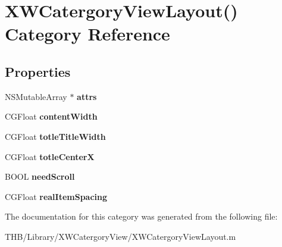 \hypertarget{category_x_w_catergory_view_layout_07_08}{}\section{X\+W\+Catergory\+View\+Layout() Category Reference}
\label{category_x_w_catergory_view_layout_07_08}
\subsection*{Properties}
\begin{DoxyCompactItemize}
\item 
\mbox{\label{category_x_w_catergory_view_layout_07_08_a1cc95694b6427f4bc37f47c714371f0c}} 
N\+S\+Mutable\+Array $\ast$ {\bfseries attrs}
\item 
\mbox{\label{category_x_w_catergory_view_layout_07_08_a2affd284ac99da67053cc58fa49ed355}} 
C\+G\+Float {\bfseries content\+Width}
\item 
\mbox{\label{category_x_w_catergory_view_layout_07_08_a4e95b7c48d33dc4331c8b7d1194efa25}} 
C\+G\+Float {\bfseries totle\+Title\+Width}
\item 
\mbox{\label{category_x_w_catergory_view_layout_07_08_a80ee7f25b333ff586dc97707c91a8648}} 
C\+G\+Float {\bfseries totle\+CenterX}
\item 
\mbox{\label{category_x_w_catergory_view_layout_07_08_a531dc40e66dc4558f2eaf7b4858455e8}} 
B\+O\+OL {\bfseries need\+Scroll}
\item 
\mbox{\label{category_x_w_catergory_view_layout_07_08_aa7b6e704aeb6b1f62d79d546c3b33139}} 
C\+G\+Float {\bfseries real\+Item\+Spacing}
\end{DoxyCompactItemize}


The documentation for this category was generated from the following file\+:\begin{DoxyCompactItemize}
\item 
T\+H\+B/\+Library/\+X\+W\+Catergory\+View/X\+W\+Catergory\+View\+Layout.\+m\end{DoxyCompactItemize}
